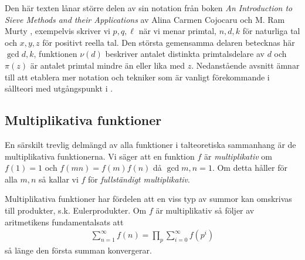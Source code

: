 
Den här texten lånar större delen av sin notation från boken \textit{An Introduction to Sieve Methods and their Applications} av Alina Carmen Cojocaru och M. Ram Murty \cite{cojocarumurty}, exempelvis skriver vi \(p, q, \ell\) när vi menar primtal, \(n, d, k\) för naturliga tal och \(x, y, z\) för positivt reella tal. Den största gemensamma delaren betecknas här \(\gcd{d, k}\), funktionen \(\nu(d)\) beskriver antalet distinkta primtalsdelare av \(d\) och \(\pi(z)\) är antalet primtal mindre än eller lika med \(z\). Nedanstående avsnitt ämnar till att etablera mer notation och tekniker som är vanligt förekommande i sållteori med utgångspunkt i \cite{cojocarumurty}.

\subsection{Multiplikativa funktioner} \label{mult}
En särskilt trevlig delmängd av alla funktioner i talteoretiska sammanhang är de multiplikativa funktionerna. Vi säger att en funktion $f$ är \textit{multiplikativ} om $f(1) = 1$ och \(f(mn) = f(m)f(n)\) då $\gcd{m,n} = 1$. Om detta håller för alla $m, n$ så kallar vi $f$ för \textit{fullständigt multiplikativ}. 

Multiplikativa funktioner har fördelen att en viss typ av summor kan omskrivas till produkter, s.k. Eulerprodukter. Om \(f\) är multiplikativ så följer av aritmetikens fundamentalsats att
\begin{align*}
    \sum_{n = 1}^\infty f(n) = \prod_p \sum_{i=0}^\infty f(p^i)
\end{align*}
så länge den första summan konvergerar. 


